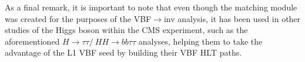 \hspace{10pt} As a final remark, it is important to note that even though the matching module was created for the purposes of the VBF$\rightarrow$inv analysis, it has been used in other studies of the Higgs boson within the CMS experiment, such as the aforementioned $H\rightarrow \tau\tau /~ HH\rightarrow bb\tau\tau$ analyses, helping them to take the advantage of the L1 VBF seed by building their VBF HLT paths.

 





\begin{center}
    \expandafter\pgfornament\expandafter{88}
\end{center}
\restoregeometry
